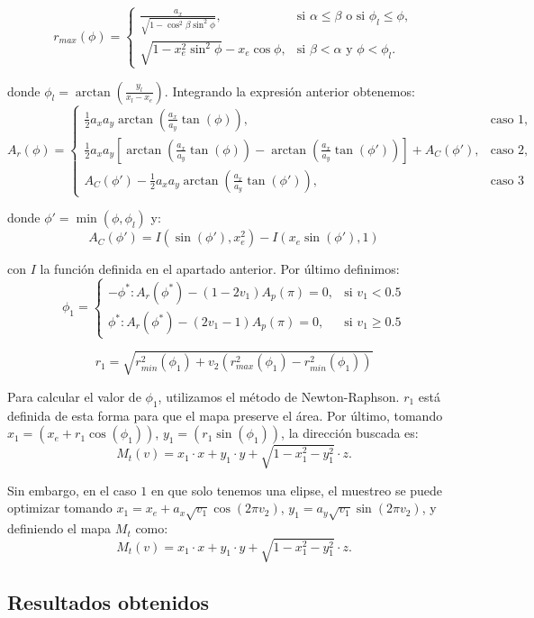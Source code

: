 \[ r_{max}(\phi) =
   \begin{cases}
      \frac{a_x}{\sqrt{1-\cos^2\beta\sin^2\phi}}, & \text{si }\alpha\leq\beta \text{ o si } \phi_l\leq\phi,\\
      \sqrt{1-x_e^2\sin^2\phi}-x_e\cos\phi, & \text{si } \beta< \alpha \text{ y } \phi < \phi_l.
   \end{cases}
  \]

donde $\phi_l=\arctan(\frac{y_l}{x_l-x_e})$. Integrando la expresión anterior obtenemos:
\[ A_r(\phi) =
   \begin{cases}
      \frac{1}{2}a_xa_y\arctan(\frac{a_x}{a_y}\tan(\phi)), & \text{caso 1}, \\
      \frac{1}{2}a_xa_y[\arctan(\frac{a_x}{a_y}\tan(\phi)) - \arctan(\frac{a_x}{a_y}\tan(\phi'))] + A_C(\phi')  , & \text{caso 2}, \\
       A_C(\phi') - \frac{1}{2}a_xa_y\arctan(\frac{a_x}{a_y}\tan(\phi')), & \text{caso 3} 
   \end{cases}
  \]

donde $\phi' = \min(\phi, \phi_l)$ y:
$$A_C(\phi') = I(\sin(\phi'),x_e^2)-I(x_e\sin(\phi'),1)$$

con $I$ la función definida en el apartado anterior. Por último definimos:
\[ \phi_1 = 
   \begin{cases} 
      -\phi^*: A_r(\phi^*)-(1-2v_1)A_p(\pi)=0,  & \text{si $v_1<0.5$} \\
      \phi^*:  A_r(\phi^*)-(2v_1-1)A_p(\pi)=0,  & \text{si $v_1\geq 0.5$}
   \end{cases}
\]

$$r_1 = \sqrt{r_{min}^2(\phi_1) + v_2 (r_{max}^2(\phi_1) - r_{min}^2(\phi_1))}$$

Para calcular el valor de $\phi_1$, utilizamos el método de Newton-Raphson. $r_1$ está definida de esta forma para que el mapa preserve el área. Por último, tomando $x_1 = (x_e + r_1\cos(\phi_1))$, $y_1 = (r_1\sin(\phi_1))$, la dirección buscada es:
$$M_t(v) = x_1\cdot x + y_1\cdot y + \sqrt{1-x_1^2-y_1^2} \cdot z.$$


Sin embargo, en el caso $1$ en que solo tenemos una elipse, el muestreo se puede optimizar tomando $x_1=x_e + a_x\sqrt{v_1}\cos(2\pi v_2)$, $y_1= a_y\sqrt{v_1}\sin(2\pi v_2)$, y definiendo el mapa $M_t$ como:
$$M_t(v) = x_1\cdot x + y_1\cdot y + \sqrt{1-x_1^2-y_1^2} \cdot z.$$


\subsection{Resultados obtenidos}

